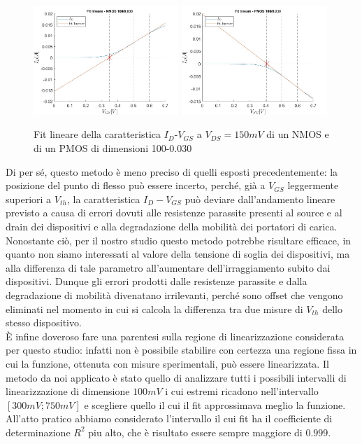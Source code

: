 \documentclass[12pt, letterpaper]{book}
\begin{document}
\begin{figure}[h!]
  \centering
  \includegraphics[width=0.49\textwidth]{LinearFit-N4-100-30}
  \includegraphics[width=0.49\textwidth]{LinearFit-P1-100-30}
  \caption{Fit lineare della caratteristica  $I_D$-$V_{GS}$ a $V_{DS}=150mV$ di un NMOS e di un PMOS di dimensioni 100-0.030 }
\end{figure}

Di per sé, questo metodo è meno preciso di quelli esposti precedentemente: la posizione del punto di flesso può essere incerto, perché, già a $V_{GS}$ leggermente superiori a $V_{th}$, la caratteristica $I_D-V_{GS}$ può deviare dall'andamento lineare previsto a causa di errori dovuti alle resistenze parassite presenti al source e al drain dei dispositivi e alla degradazione della mobilità dei portatori di carica.
Nonostante ciò, per il nostro studio questo metodo potrebbe risultare efficace, in quanto non siamo interessati al valore della tensione di soglia dei dispositivi, ma alla differenza di tale parametro all'aumentare dell'irraggiamento subito dai dispositivi. Dunque gli errori prodotti dalle resistenze parassite e dalla degradazione di mobilità divenatano irrilevanti, perché sono offset che vengono eliminati nel momento in cui si calcola la differenza tra due misure di $V_{th}$ dello stesso dispositivo.\\
È infine doveroso fare una parentesi sulla regione di linearizzazione considerata per questo studio: infatti non è possibile stabilire con certezza una regione fissa in cui la funzione, ottenuta con misure sperimentali, può essere linearizzata. Il metodo da noi applicato è stato quello di analizzare tutti i possibili intervalli di linearizzazione di dimensione $100 mV$ i cui estremi ricadono nell'intervallo $[300 mV ; 750mV]$ e scegliere quello il cui il fit approssimava meglio la funzione. All'atto pratico abbiamo considerato l'intervallo il cui fit ha il coefficiente di determinazione $R^2$ piu alto, che è risultato essere sempre maggiore di $0.999$.
\end{document}
